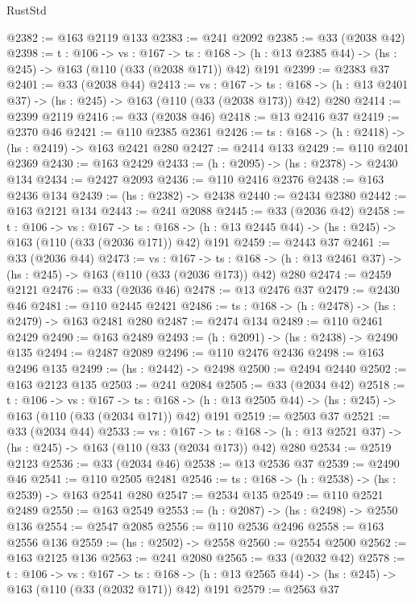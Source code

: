 \begin{lexlean}{RustStd}
\begin{coremodule}
{\begin{coremodule}
{{{{{@2382 := @163 @2119 @133
@2383 := @241 @2092
@2385 := @33 (@2038 @42)
@2398 := {t : @106} ->
  {vs : @167} ->
  {ts : @168} -> (h : @13 @2385 @44) -> (hs : @245) -> @163 (@110 (@33 (@2038 @171)) @42) @191
@2399 := @2383 @37
@2401 := @33 (@2038 @44)
@2413 := {vs : @167} ->
  {ts : @168} -> (h : @13 @2401 @37) -> (hs : @245) -> @163 (@110 (@33 (@2038 @173)) @42) @280
@2414 := @2399 @2119
@2416 := @33 (@2038 @46)
@2418 := @13 @2416 @37
@2419 := @2370 @46
@2421 := @110 @2385 @2361
@2426 := {ts : @168} -> (h : @2418) -> (hs : @2419) -> @163 @2421 @280
@2427 := @2414 @133
@2429 := @110 @2401 @2369
@2430 := @163 @2429
@2433 := (h : @2095) -> (hs : @2378) -> @2430 @134
@2434 := @2427 @2093
@2436 := @110 @2416 @2376
@2438 := @163 @2436 @134
@2439 := (hs : @2382) -> @2438
@2440 := @2434 @2380
@2442 := @163 @2121 @134
@2443 := @241 @2088
@2445 := @33 (@2036 @42)
@2458 := {t : @106} ->
  {vs : @167} ->
  {ts : @168} -> (h : @13 @2445 @44) -> (hs : @245) -> @163 (@110 (@33 (@2036 @171)) @42) @191
@2459 := @2443 @37
@2461 := @33 (@2036 @44)
@2473 := {vs : @167} ->
  {ts : @168} -> (h : @13 @2461 @37) -> (hs : @245) -> @163 (@110 (@33 (@2036 @173)) @42) @280
@2474 := @2459 @2121
@2476 := @33 (@2036 @46)
@2478 := @13 @2476 @37
@2479 := @2430 @46
@2481 := @110 @2445 @2421
@2486 := {ts : @168} -> (h : @2478) -> (hs : @2479) -> @163 @2481 @280
@2487 := @2474 @134
@2489 := @110 @2461 @2429
@2490 := @163 @2489
@2493 := (h : @2091) -> (hs : @2438) -> @2490 @135
@2494 := @2487 @2089
@2496 := @110 @2476 @2436
@2498 := @163 @2496 @135
@2499 := (hs : @2442) -> @2498
@2500 := @2494 @2440
@2502 := @163 @2123 @135
@2503 := @241 @2084
@2505 := @33 (@2034 @42)
@2518 := {t : @106} ->
  {vs : @167} ->
  {ts : @168} -> (h : @13 @2505 @44) -> (hs : @245) -> @163 (@110 (@33 (@2034 @171)) @42) @191
@2519 := @2503 @37
@2521 := @33 (@2034 @44)
@2533 := {vs : @167} ->
  {ts : @168} -> (h : @13 @2521 @37) -> (hs : @245) -> @163 (@110 (@33 (@2034 @173)) @42) @280
@2534 := @2519 @2123
@2536 := @33 (@2034 @46)
@2538 := @13 @2536 @37
@2539 := @2490 @46
@2541 := @110 @2505 @2481
@2546 := {ts : @168} -> (h : @2538) -> (hs : @2539) -> @163 @2541 @280
@2547 := @2534 @135
@2549 := @110 @2521 @2489
@2550 := @163 @2549
@2553 := (h : @2087) -> (hs : @2498) -> @2550 @136
@2554 := @2547 @2085
@2556 := @110 @2536 @2496
@2558 := @163 @2556 @136
@2559 := (hs : @2502) -> @2558
@2560 := @2554 @2500
@2562 := @163 @2125 @136
@2563 := @241 @2080
@2565 := @33 (@2032 @42)
@2578 := {t : @106} ->
  {vs : @167} ->
  {ts : @168} -> (h : @13 @2565 @44) -> (hs : @245) -> @163 (@110 (@33 (@2032 @171)) @42) @191
@2579 := @2563 @37
}}}}}
\end{coremodule}}
\end{coremodule}
\end{lexlean}
